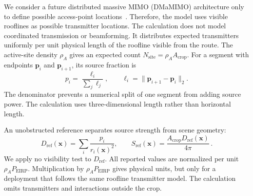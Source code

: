 \documentclass{IEEEoj}
\begin{document}
We consider a future distributed massive MIMO (DMaMIMO) architecture only to
define possible access-point locations~\cite{wydaeghe2026,ngo2017}. Therefore,
the model uses visible rooflines as possible transmitter locations. The calculation does not model coordinated
transmission or beamforming. It distributes expected transmitters uniformly per
unit physical length of the roofline visible from the route. The active-site density $\rho_A$ gives an
expected count $N_{\mathrm{site}}=\rho_A A_{\mathrm{crop}}$. For a segment with
endpoints $\mathbf{p}_i$ and $\mathbf{p}_{i+1}$, its source fraction is
\begin{equation}
p_i=\frac{\ell_i}{\sum_j \ell_j},\qquad
\ell_i=\lVert\mathbf{p}_{i+1}-\mathbf{p}_i\rVert_2 .
\label{eq:source-measure}
\end{equation}
The denominator prevents a numerical split of one segment from adding source
power. The calculation uses three-dimensional length rather than horizontal
length.

An unobstructed reference separates source strength from scene geometry:
\begin{equation}
D_{\mathrm{ref}}(\mathbf{x})=
\sum_i\frac{p_i}{r_i(\mathbf{x})^2},
\qquad
S_{\mathrm{ref}}(\mathbf{x})=
\frac{A_{\mathrm{crop}}D_{\mathrm{ref}}(\mathbf{x})}{4\pi} \, .
\label{eq:reference-scale}
\end{equation}
We apply no visibility test to $D_{\mathrm{ref}}$. All reported values are
normalized per unit $\rho_A P_{\mathrm{EIRP}}$. Multiplication by
$\rho_A P_{\mathrm{EIRP}}$ gives physical units, but only for a deployment
that follows the same roofline transmitter model. The calculation omits
transmitters and interactions outside the crop.
\end{document}
